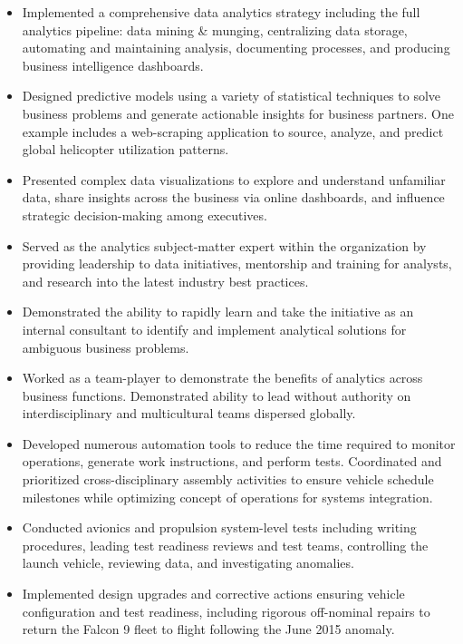 \documentclass[11pt,letterpaper,sans]{moderncv} %
\begin{document}
\begin{itemize}
\item Implemented a comprehensive data analytics strategy including the full analytics pipeline: data mining \& munging, centralizing data storage, automating and maintaining analysis, documenting processes, and producing business intelligence dashboards.
\item Designed predictive models using a variety of statistical techniques to solve business problems and generate actionable insights for business partners. One example includes a web-scraping application to source, analyze, and predict global helicopter utilization patterns.
\item Presented complex data visualizations to explore and understand unfamiliar data, share insights across the business via online dashboards, and influence strategic decision-making among executives. 
\item Served as the analytics subject-matter expert within the organization by providing leadership to data initiatives, mentorship and training for analysts, and research into the latest industry best practices.
\item Demonstrated the ability to rapidly learn and take the initiative as an internal consultant to identify and implement analytical solutions for ambiguous business problems.
\item Worked as a team-player to demonstrate the benefits of analytics across business functions. Demonstrated ability to lead without authority on interdisciplinary and multicultural teams dispersed globally.
\end{itemize}
\vspace{6pt}


\begin{itemize}
\item Developed numerous automation tools to reduce the time required to monitor operations, generate work instructions, and perform tests. Coordinated and prioritized cross-disciplinary assembly activities to ensure vehicle schedule milestones while optimizing concept of operations for systems integration.
\item Conducted avionics and propulsion system-level tests including writing procedures, leading test readiness reviews and test teams, controlling the launch vehicle, reviewing data, and investigating anomalies.
\item Implemented design upgrades and corrective actions ensuring vehicle configuration and test readiness, including rigorous off-nominal repairs to return the Falcon 9 fleet to flight following the June 2015 anomaly.
\end{itemize}
\vspace{6pt}
\end{document}
